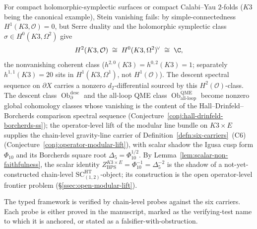 \begin{rmk}
\label{rmk:compact-frontier-targets}
For compact holomorphic-symplectic surfaces or compact Calabi--Yau
\(2\)-folds (\(K3\) being the canonical example), Stein vanishing
fails: by simple-connectedness \(H^1(K3,\mathcal O)=0\), but Serre
duality and the holomorphic symplectic class
\(\sigma\in H^0(K3,\Omega^2)\) give
\[
  H^2(K3,\mathcal O)\;\cong\;H^0(K3,\Omega^2)^{\!\vee}\;\cong\;\C,
\]
the nonvanishing coherent class
(\(h^{2,0}(K3)=h^{0,2}(K3)=1\); separately \(h^{1,1}(K3)=20\) sits in
\(H^1(K3,\Omega^1)\), not \(H^1(\mathcal O)\)).  The descent spectral
sequence on \(\partial X\) carries a nonzero \(d_2\)-differential
sourced by this \(H^2(\mathcal O)\)-class.
The descent class
\(\operatorname{Ob}^{\mathrm{desc}}_\partial\) and the all-loop QME
class \(\operatorname{Ob}^{\mathrm{QME}}_{\mathrm{all\mbox{-}loop}}\)
become nonzero global cohomology classes whose vanishing is the
content of the Hall--Drinfeld--Borcherds comparison spectral
sequence (Conjecture~\ref{conj:hall-drinfeld-borcherds-ss}); the
operator-level lift of the modular line bundle on \(K3\times E\)
supplies the chain-level gravity-line carrier of
Definition~\ref{defn:six-carriers}~(C6)
(Conjecture~\ref{conj:operator-modular-lift}), with scalar shadow the
Igusa cusp form \(\Phi_{10}\) and its Borcherds square root
\(\Delta_5=\Phi_{10}^{1/2}\).  By
Lemma~\ref{lem:scalar-non-faithfulness}, the scalar identity
\(Z^{K3\times E}_{\mathrm{BPS}}=\Phi_{10}^{-1}=\Delta_5^{-2}\) is the
shadow of a not-yet-constructed chain-level
\(\mathrm{SC}^{\mathrm{HT}}_{(1,2)}\)-object; its construction is
the open operator-level frontier problem
(\S\ref{ssec:open-modular-lift}).
\end{rmk}



The typed framework is verified by chain-level probes against the
six carriers.  Each probe is either proved in the manuscript, marked
as the verifying-test name to which it is anchored, or stated as a
falsifier-with-obstruction.

